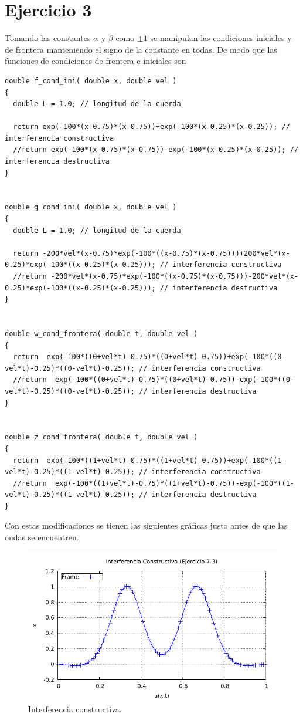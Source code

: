 \section*{Ejercicio 3}
Tomando las constantes $\alpha$ y $\beta$ como $\pm 1$ se manipulan las condiciones iniciales y de frontera manteniendo el signo de la constante en todas. De modo que las funciones de condiciones de frontera e iniciales son

\begin{lstlisting}
double f_cond_ini( double x, double vel )
{
  double L = 1.0; // longitud de la cuerda

  return exp(-100*(x-0.75)*(x-0.75))+exp(-100*(x-0.25)*(x-0.25)); // interferencia constructiva
  //return exp(-100*(x-0.75)*(x-0.75))-exp(-100*(x-0.25)*(x-0.25)); // interferencia destructiva
}


double g_cond_ini( double x, double vel )
{
  double L = 1.0; // longitud de la cuerda

  return -200*vel*(x-0.75)*exp(-100*((x-0.75)*(x-0.75)))+200*vel*(x-0.25)*exp(-100*((x-0.25)*(x-0.25))); // interferencia constructiva
  //return -200*vel*(x-0.75)*exp(-100*((x-0.75)*(x-0.75)))-200*vel*(x-0.25)*exp(-100*((x-0.25)*(x-0.25))); // interferencia destructiva
}


double w_cond_frontera( double t, double vel )
{
  return  exp(-100*((0+vel*t)-0.75)*((0+vel*t)-0.75))+exp(-100*((0-vel*t)-0.25)*((0-vel*t)-0.25)); // interferencia constructiva
  //return  exp(-100*((0+vel*t)-0.75)*((0+vel*t)-0.75))-exp(-100*((0-vel*t)-0.25)*((0-vel*t)-0.25)); // interferencia destructiva
}


double z_cond_frontera( double t, double vel )
{
  return  exp(-100*((1+vel*t)-0.75)*((1+vel*t)-0.75))+exp(-100*((1-vel*t)-0.25)*((1-vel*t)-0.25)); // interferencia constructiva
  //return  exp(-100*((1+vel*t)-0.75)*((1+vel*t)-0.75))-exp(-100*((1-vel*t)-0.25)*((1-vel*t)-0.25)); // interferencia destructiva
}
\end{lstlisting}

Con estas modificaciones se tienen las siguientes gráficas justo antes de que las ondas se encuentren.

\begin{figure}[H]
	\centering
	\includegraphics[scale=1]{../img/ej7-3c.pdf}
	\caption{Interferencia constructiva.}
	\label{ej7-3c}
\end{figure}


